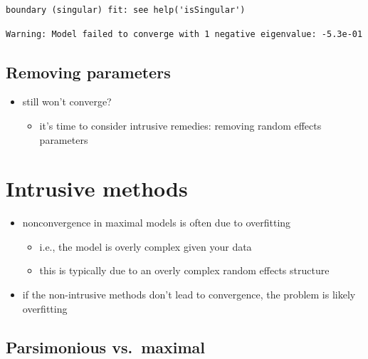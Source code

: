 \documentclass[
  letterpaper,
  DIV=11,
  numbers=noendperiod]{scrartcl}
\providecommand{\tightlist}{%
  \setlength{\itemsep}{0pt}\setlength{\parskip}{0pt}}\usepackage{longtable,booktabs,array}
\begin{document}
\begin{verbatim}
boundary (singular) fit: see help('isSingular')
\end{verbatim}

\begin{verbatim}
Warning: Model failed to converge with 1 negative eigenvalue: -5.3e-01
\end{verbatim}

\hypertarget{removing-parameters}{%
\subsection{Removing parameters}\label{removing-parameters}}

\begin{itemize}
\tightlist
\item
  still won't converge?

  \begin{itemize}
  \tightlist
  \item
    it's time to consider intrusive remedies: removing random effects
    parameters
  \end{itemize}
\end{itemize}

\hypertarget{intrusive-methods}{%
\section{Intrusive methods}\label{intrusive-methods}}

\begin{itemize}
\tightlist
\item
  nonconvergence in maximal models is often due to overfitting

  \begin{itemize}
  \tightlist
  \item
    i.e., the model is overly complex given your data
  \item
    this is typically due to an overly complex random effects structure
  \end{itemize}
\item
  if the non-intrusive methods don't lead to convergence, the problem is
  likely overfitting
\end{itemize}

\hypertarget{parsimonious-vs.-maximal}{%
\subsection{Parsimonious vs.~maximal}\label{parsimonious-vs.-maximal}}
\end{document}
